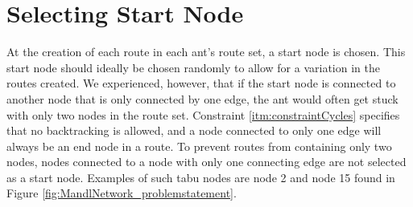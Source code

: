 \section{Selecting Start Node}

At the creation of each route in each ant's route set, a start node is chosen. This start node should ideally be chosen randomly to allow for a variation in the routes created. We experienced, however, that if the start node is connected to another node that is only connected by one edge, the ant would often get stuck with only two nodes in the route set. Constraint \vref{itm:constraintCycles} specifies that no backtracking is allowed, and a node connected to only one edge will always be an end node in a route. To prevent routes from containing only two nodes, nodes connected to a node with only one connecting edge are not selected as a start node. Examples of such tabu nodes are node 2 and node 15 found in Figure \vref{fig:MandlNetwork_problemstatement}. 